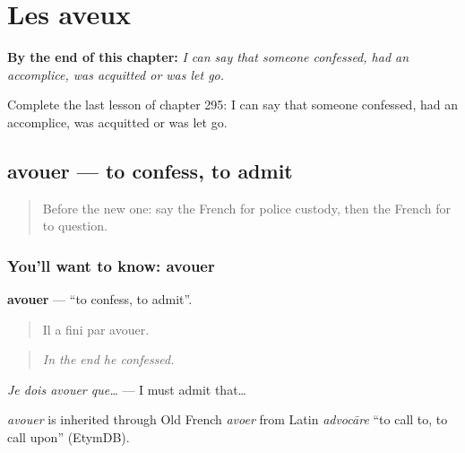 
\chapter{Les aveux}
\label{ch:fr-les-aveux}

\begin{chapteropening}
\textbf{By the end of this chapter:} \emph{I can say that someone confessed, had an accomplice, was acquitted or was let go.}

Complete the last lesson of chapter 295: I can say that someone confessed, had an accomplice, was acquitted or was let go.
\end{chapteropening}

\section[avouer]{avouer — to confess, to admit}

\label{lesson:FR-C295-avouer}



\begin{quote}
Before the new one: say the French for police custody, then the French for to question.
\end{quote}

\subsection*{You'll want to know: avouer}
\textbf{avouer} — \textquotedblleft{}to confess, to admit\textquotedblright{}.

\begin{quote}
Il a fini par avouer.
\end{quote}

\begin{quote}
\emph{In the end he confessed.}
\end{quote}

\emph{Je dois avouer que…} — I must admit that…

\begin{cousinweb}
\emph{avouer} is inherited through Old French \emph{avoer} from Latin \emph{advocāre} \textquotedblleft{}to call to, to call upon\textquotedblright{} (EtymDB).
\end{cousinweb}

